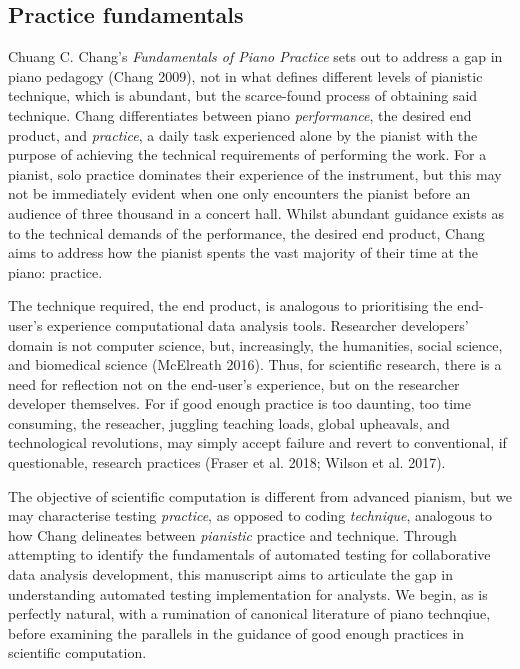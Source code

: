 \documentclass[
]{article}
\begin{document}
\hypertarget{practice-fundamentals}{%
\subsection{Practice fundamentals}\label{practice-fundamentals}}

Chuang C. Chang's \emph{Fundamentals of Piano Practice} sets out to
address a gap in piano pedagogy (Chang 2009), not in what defines
different levels of pianistic technique, which is abundant, but the
scarce-found process of obtaining said technique. Chang differentiates
between piano \emph{performance}, the desired end product, and
\emph{practice}, a daily task experienced alone by the pianist with the
purpose of achieving the technical requirements of performing the work.
For a pianist, solo practice dominates their experience of the
instrument, but this may not be immediately evident when one only
encounters the pianist before an audience of three thousand in a concert
hall. Whilst abundant guidance exists as to the technical demands of the
performance, the desired end product, Chang aims to address how the
pianist spents the vast majority of their time at the piano: practice.

The technique required, the end product, is analogous to prioritising
the end-user's experience computational data analysis tools. Researcher
developers' domain is not computer science, but, increasingly, the
humanities, social science, and biomedical science (McElreath 2016).
Thus, for scientific research, there is a need for reflection not on the
end-user's experience, but on the researcher developer themselves. For
if good enough practice is too daunting, too time consuming, the
reseacher, juggling teaching loads, global upheavals, and technological
revolutions, may simply accept failure and revert to conventional, if
questionable, research practices (Fraser et al. 2018; Wilson et al.
2017).

The objective of scientific computation is different from advanced
pianism, but we may characterise testing \emph{practice}, as opposed to
coding \emph{technique}, analogous to how Chang delineates between
\emph{pianistic} practice and technique. Through attempting to identify
the fundamentals of automated testing for collaborative data analysis
development, this manuscript aims to articulate the gap in understanding
automated testing implementation for analysts. We begin, as is perfectly
natural, with a rumination of canonical literature of piano technqiue,
before examining the parallels in the guidance of good enough practices
in scientific computation.
\end{document}

